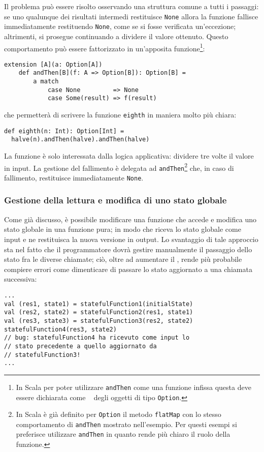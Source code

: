 Il problema può essere risolto osservando una struttura comune a tutti i passaggi: se uno qualunque dei risultati intermedi restituisce \lstinline{None} allora la funzione fallisce immediatamente restituendo \lstinline{None}, come se si fosse verificata un'eccezione; altrimenti, si prosegue continuando a dividere il valore ottenuto.
Questo comportamento può essere fattorizzato in un'apposita funzione\footnote{In Scala per poter utilizzare \lstinline{andThen} come una funzione infissa questa deve essere dichiarata come ~\cite{cit:scala-extension-methods} degli oggetti di tipo \lstinline{Option}.}:
\begin{lstlisting}[language=scala3]
extension [A](a: Option[A])
	def andThen[B](f: A => Option[B]): Option[B] =
		a match
			case None         => None
			case Some(result) => f(result)
\end{lstlisting}
che permetterà di scrivere la funzione \lstinline{eighth} in maniera molto più chiara:
\begin{lstlisting}[language=scala3]
def eighth(n: Int): Option[Int] =
  halve(n).andThen(halve).andThen(halve)
\end{lstlisting}
La funzione è solo interessata dalla logica applicativa: dividere tre volte il valore in input. La gestione del fallimento è delegata ad \lstinline{andThen}\footnote{In Scala è già definito per \lstinline{Option} il metodo \lstinline{flatMap} con lo stesso comportamento di \lstinline{andThen} mostrato nell'esempio. Per questi esempi si preferisce utilizzare \lstinline{andThen} in quanto rende più chiaro il ruolo della funzione.} che, in caso di fallimento, restituisce immediatamente \lstinline{None}.

\subsubsection{Gestione della lettura e modifica di uno stato globale}
\label{gestione-della-lettura-e-modifica-di-uno-stato-globale}

Come già discusso, è possibile modificare una funzione che accede e modifica uno stato globale in una funzione pura; in modo che riceva lo stato globale come input e ne restituisca la nuova versione in output.
Lo svantaggio di tale approccio sta nel fatto che il programmatore dovrà gestire manualmente il passaggio dello stato fra le diverse chiamate; ciò, oltre ad aumentare il , rende più probabile compiere errori come dimenticare di passare lo stato aggiornato a una chiamata successiva:
\begin{lstlisting}[language=scala3]
...
val (res1, state1) = statefulFunction1(initialState)
val (res2, state2) = statefulFunction2(res1, state1)
val (res3, state3) = statefulFunction3(res2, state2)
statefulFunction4(res3, state2)
// bug: statefulFunction4 ha ricevuto come input lo
// stato precedente a quello aggiornato da 
// statefulFunction3!
...
\end{lstlisting}

